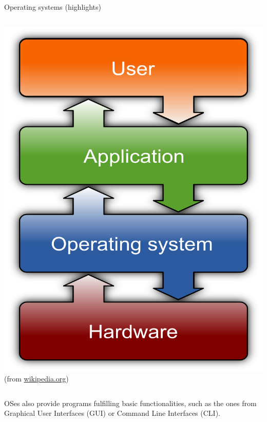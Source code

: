 \begin{frame}{Operating systems (highlights)}
\begin{columns}
    \begin{column}{.31\textwidth}
      \begin{center}
        \includegraphics[width=\textwidth]{images/operating_system.png}
        {\tiny (from \href{https://en.wikipedia.org/wiki/Operating_system}{wikipedia.org})}
      \end{center}
    \end{column}

  \end{columns}

  \vspace{4mm}

  OSes also provide programs fulfilling basic functionalities, such as the ones
  from Graphical User Interfaces (GUI) or Command Line Interfaces (CLI).

\end{frame}